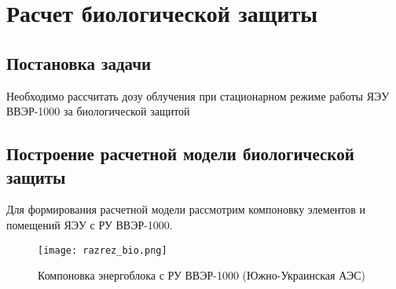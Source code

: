 \section{Расчет биологической защиты} %
\subsection{Постановка задачи}
Необходимо рассчитать дозу облучения при стационарном режиме работы ЯЭУ ВВЭР-1000 за биологической защитой

\subsection{Построение расчетной модели биологической защиты}
Для формирования расчетной модели рассмотрим компоновку элементов и помещений ЯЭУ с РУ ВВЭР-1000.

\begin{figure}[H]
	\begin{center}
		\texttt{[image: razrez\_bio.png]}
		\caption{Компоновка энергоблока с РУ ВВЭР-1000 (Южно-Украинская АЭС)}
		\label{pic:razrez_bio} %
	\end{center}
\end{figure}
